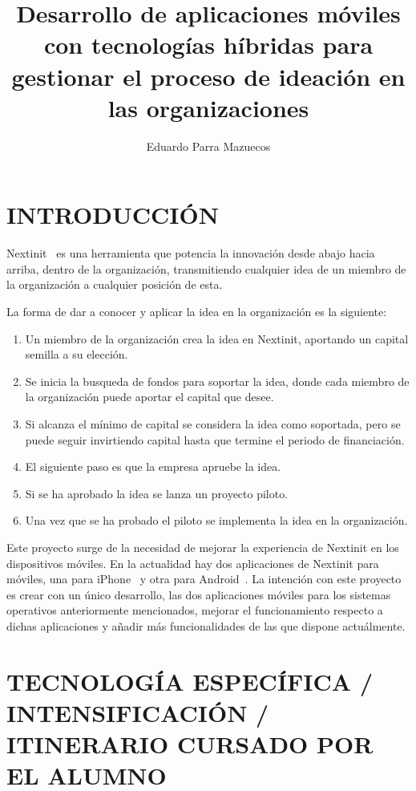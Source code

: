 \documentclass{pre-tfg}
\title{Desarrollo de aplicaciones móviles con tecnologías híbridas para gestionar el proceso de ideación en las organizaciones}
\author{Eduardo Parra Mazuecos}
\begin{document}
    \maketitle
    \tableofcontents

    \newpage

    \section{INTRODUCCIÓN}

    Nextinit~\cite{NEXT} es una herramienta que potencia la innovación desde abajo hacia arriba, dentro de la
    organización, transmitiendo cualquier idea de un miembro de la organización a cualquier posición de esta.

    La forma de dar a conocer y aplicar la idea en la organización es la siguiente:
    \begin{enumerate}
        \item Un miembro de la organización crea la idea en Nextinit, aportando un capital semilla a su elección.
        \item Se inicia la busqueda de fondos para soportar la idea, donde cada miembro de la organización puede
        aportar el capital que desee.
        \item Si alcanza el mínimo de capital se considera la idea como soportada, pero se puede seguir invirtiendo
        capital hasta que termine el periodo de financiación.
        \item El siguiente paso es que la empresa apruebe la idea.
        \item Si se ha aprobado la idea se lanza un proyecto piloto.
        \item Una vez que se ha probado el piloto se implementa la idea en la organización.
    \end{enumerate}

    Este proyecto surge de la necesidad de mejorar la experiencia de Nextinit en los dispositivos móviles. En la
    actualidad hay dos aplicaciones de Nextinit para móviles, una para iPhone~\cite{NEXTIP} y otra para
    Android~\cite{NEXTAN}. La intención con este proyecto es crear con un único desarrollo, las dos aplicaciones
    móviles para los sistemas operativos anteriormente mencionados, mejorar el funcionamiento respecto a dichas
    aplicaciones y añadir más funcionalidades de las que dispone actuálmente.


    \section{TECNOLOGÍA ESPECÍFICA / INTENSIFICACIÓN / ITINERARIO CURSADO POR EL ALUMNO}
\end{document}
